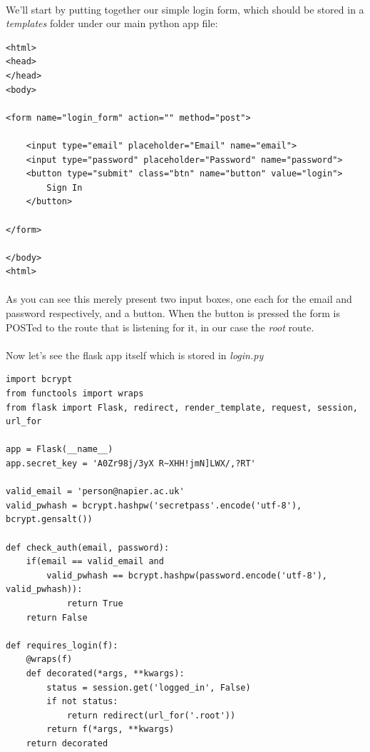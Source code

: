 \documentclass[12pt, a4paper, oneside]{book}
\begin{document}
{\paragraph{} We'll start by putting together our simple login form, which should be stored in a \emph{templates} folder under our main python app file:

\begin{lstlisting}
<html>
<head>
</head>
<body>

<form name="login_form" action="" method="post">

    <input type="email" placeholder="Email" name="email">
    <input type="password" placeholder="Password" name="password">
    <button type="submit" class="btn" name="button" value="login">
        Sign In
    </button>

</form>

</body>
<html>
\end{lstlisting}

\paragraph{} As you can see this merely present two input boxes, one each for the email and password respectively, and a button. When the button is pressed the form is POSTed to the route that is listening for it, in our case the \emph{root} route.

\paragraph{} Now let's see the flask app itself which is stored in \emph{login.py}

\begin{lstlisting}
import bcrypt
from functools import wraps
from flask import Flask, redirect, render_template, request, session, url_for

app = Flask(__name__)
app.secret_key = 'A0Zr98j/3yX R~XHH!jmN]LWX/,?RT'

valid_email = 'person@napier.ac.uk'
valid_pwhash = bcrypt.hashpw('secretpass'.encode('utf-8'), bcrypt.gensalt())

def check_auth(email, password):
    if(email == valid_email and 
        valid_pwhash == bcrypt.hashpw(password.encode('utf-8'), valid_pwhash)):
            return True
    return False

def requires_login(f):
    @wraps(f)
    def decorated(*args, **kwargs):
        status = session.get('logged_in', False)
        if not status:
            return redirect(url_for('.root'))
        return f(*args, **kwargs)
    return decorated


\end{lstlisting}}
\end{document}
